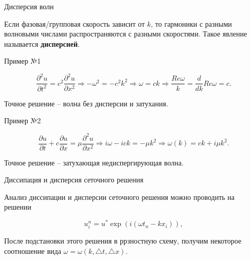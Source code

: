 \documentclass[10pt,xcolor=pst,aspectratio=169]{beamer}
\begin{document}
\begin{frame}{Дисперсия волн}

	\transdissolve[duration=0.1]
	\justifying
	\large

	Если фазовая/групповая скорость зависит от $k$, то гармоники с разными волновыми числами распространяются с разными скоростями. Такое явление называется \textbf{дисперсией}.

\end{frame}

\begin{frame}{Пример №1}

	\transdissolve[duration=0.1]
	\justifying
	\large

	\[
		\frac{\partial^{2} u}{\partial t^{2}} = c^{2} \frac{\partial^{2} u}{\partial x^{2}} \Rightarrow - \omega^{2} = - c^{2} k^{2} \Rightarrow \omega = c k \Rightarrow \frac{Re \omega}{k} = \frac{d}{d k} Re \omega = c.
	\]
	
	Точное решение -- волна без дисперсии и затухания.

\end{frame}

\begin{frame}{Пример №2}

	\transdissolve[duration=0.1]
	\justifying
	\large

	\[
		\frac{\partial u}{\partial t} + c \frac{\partial u}{\partial x} = \mu \frac{\partial^{2} u}{\partial x^{2}} \Rightarrow i \omega - i c k = - \mu k^{2} \Rightarrow \omega(k) = c k + i \mu k^{2}.
	\]
	
	Точное решение -- затухающая недиспергирующая волна.

\end{frame}

\begin{frame}{Диссипация и дисперсия сеточного решения}

	\transdissolve[duration=0.1]
	\justifying
	\large

	Анализ диссипации и дисперсии сеточного решения можно проводить на решении

	\[
		u^{n}_{i} = u^{*} \exp{(i (\omega t_{n} - k x_{i}))} ,
	\]
	
	После подстановки этого решения в ррзностную схему, получим некоторое соотношение вида $\omega = \omega(k, \triangle t, \triangle x)$.

\end{frame}
\end{document}
